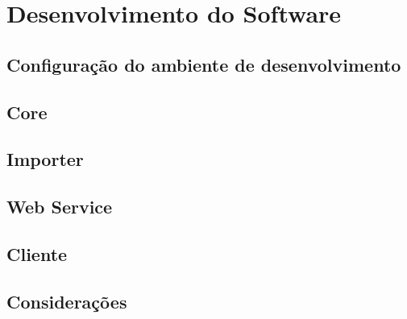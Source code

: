 \chapter{Desenvolvimento do Software}
\label{chap:desenv}

\section{Configuração do ambiente de desenvolvimento}

\section{Core}

\section{Importer}

\section{Web Service}

\section{Cliente}

\section{Considerações}